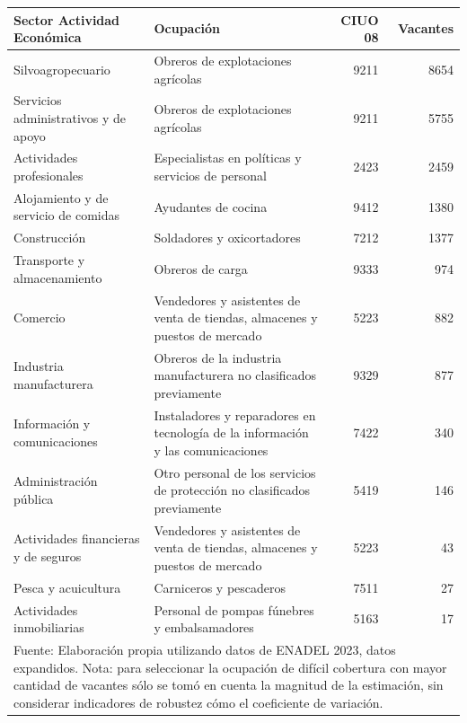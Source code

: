\documentclass[
  14pt,
]{article}
\begin{document}
\begin{table}
{\centering
\begin{tabular}{l>{\raggedright\arraybackslash}p{7cm}rr}
\toprule
Sector Actividad Económica & Ocupación & CIUO 08 & Vacantes\\
\midrule
Silvoagropecuario & Obreros de explotaciones agrícolas & 9211 & 8654\\
Servicios administrativos y de apoyo & Obreros de explotaciones agrícolas & 9211 & 5755\\
Actividades profesionales & Especialistas en políticas y servicios de personal & 2423 & 2459\\
Alojamiento y de servicio de comidas & Ayudantes de cocina & 9412 & 1380\\
Construcción & Soldadores y oxicortadores & 7212 & 1377\\
\addlinespace
Transporte y almacenamiento & Obreros de carga & 9333 & 974\\
Comercio & Vendedores y asistentes de venta de tiendas, almacenes y puestos de mercado & 5223 & 882\\
Industria manufacturera & Obreros de la industria manufacturera no clasificados previamente & 9329 & 877\\
Información y comunicaciones & Instaladores y reparadores en tecnología de la información y las comunicaciones & 7422 & 340\\
Administración pública & Otro personal de los servicios de protección no clasificados previamente & 5419 & 146\\
\addlinespace
Actividades financieras y de seguros & Vendedores y asistentes de venta de tiendas, almacenes y puestos de mercado & 5223 & 43\\
Pesca y acuicultura & Carniceros y pescaderos & 7511 & 27\\
Actividades inmobiliarias & Personal de pompas fúnebres y embalsamadores & 5163 & 17\\
\bottomrule
\multicolumn{4}{l}{\rule{0pt}{1em}Fuente: Elaboración propia utilizando datos de ENADEL 2023, datos expandidos. Nota: para seleccionar la ocupación de difícil cobertura con mayor cantidad de vacantes sólo se tomó en cuenta la magnitud de la estimación, sin considerar indicadores de robustez cómo el coeficiente de variación.}\\
\end{tabular}

}

\end{table}%

\newpage
\end{document}
